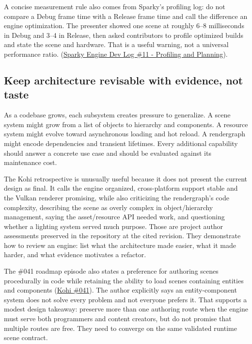A concise measurement rule also comes from Sparky's profiling log: do not compare a Debug frame time with a Release frame time and call the difference an engine optimization. The presenter showed one scene at roughly 6--8 milliseconds in Debug and 3--4 in Release, then asked contributors to profile optimized builds and state the scene and hardware. That is a useful warning, not a universal performance ratio. (\href{https://www.youtube.com/watch?v=cimYa67cR-U&t=6m30s}{Sparky Engine Dev Log \#11 - Profiling and Planning}).

\subsection{Keep architecture revisable with evidence, not taste}\label{06-engine-ii-ch041-keep-architecture-revisable-with-evidence-not-taste}

\hypertarget{06-engine-ii-ch041-keep-architecture-revisable-with-evidence-not-taste}{}

As a codebase grows, each subsystem creates pressure to generalize. A scene system might grow from a list of objects to hierarchy and components. A resource system might evolve toward asynchronous loading and hot reload. A rendergraph might encode dependencies and transient lifetimes. Every additional capability should answer a concrete use case and should be evaluated against its maintenance cost.

The Kohi retrospective is unusually useful because it does not present the current design as final. It calls the engine organized, cross-platform support stable and the Vulkan renderer promising, while also criticizing the rendergraph's code complexity, describing the scene as overly complex in object/hierarchy management, saying the asset/resource API needed work, and questioning whether a lighting system served much purpose. Those are project author assessments preserved in the repository at the cited revision. They demonstrate how to review an engine: list what the architecture made easier, what it made harder, and what evidence motivates a refactor.

The \#041 roadmap episode also states a preference for authoring scenes procedurally in code while retaining the ability to load scenes containing entities and components (\href{https://www.youtube.com/watch?v=SS8Zn13cZus}{Kohi \#041}). The author explicitly says an entity-component system does not solve every problem and not everyone prefers it. That supports a modest design takeaway: preserve more than one authoring route when the engine must serve both programmers and content creators, but do not promise that multiple routes are free. They need to converge on the same validated runtime scene contract.

